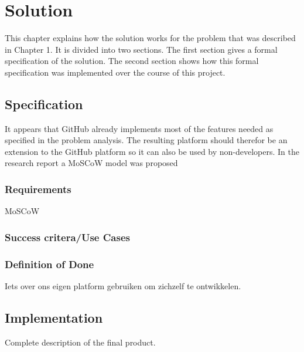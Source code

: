 \chapter{Solution}

This chapter explains how the solution works for the problem that was described in Chapter 1. It is divided into two sections. The first section gives a formal specification of the solution. The second section shows how this formal specification was implemented over the course of this project.

\section{Specification}
It appears that GitHub already implements most of the features needed as specified in the problem analysis. The resulting platform should therefor be an extension to the GitHub platform so it can also be used by non-developers. In the research report a MoSCoW model was proposed 

\subsection{Requirements}
MoSCoW

\subsection{Success critera/Use Cases}

\subsection{Definition of Done}
Iets over ons eigen platform gebruiken om zichzelf te ontwikkelen.


\section{Implementation}
Complete description of the final product. %





